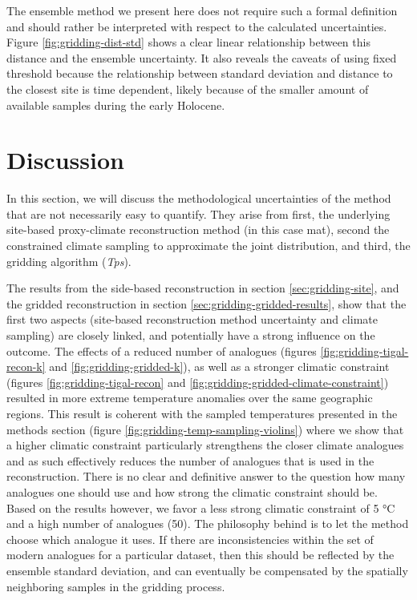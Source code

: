 \documentclass[
11pt, %
english, %
singlespacing, %
headsepline, %
]{MastersDoctoralThesis} %
\begin{document}
\begin{NoHyper}
\begin{refsection}
The ensemble method we present here does not require such a formal definition and should rather be interpreted with respect to the calculated uncertainties. Figure \ref{fig:gridding-dist-std} shows a clear linear relationship between this distance and the ensemble uncertainty. It also reveals the caveats of using fixed threshold because the relationship between standard deviation and distance to the closest site is time dependent, likely because of the smaller amount of available samples during the early Holocene.

\section{Discussion}  \label{sec:gridding-discussion}
In this section, we will discuss the methodological uncertainties of the method that are not necessarily easy to quantify. They arise from first, the underlying site-based proxy-climate reconstruction method (in this case \gls{mat}), second the constrained climate sampling to approximate the joint distribution, and third, the gridding algorithm (\textit{Tps}).

The results from the side-based reconstruction in section \ref{sec:gridding-site}, and the gridded reconstruction in section \ref{sec:gridding-gridded-results}, show that the first two aspects (site-based reconstruction method uncertainty and climate sampling) are closely linked, and potentially have a strong influence on the outcome. The effects of a reduced number of analogues (figures \ref{fig:gridding-tigal-recon-k} and \ref{fig:gridding-gridded-k}), as well as a stronger climatic constraint (figures \ref{fig:gridding-tigal-recon} and \ref{fig:gridding-gridded-climate-constraint}) resulted in more extreme temperature anomalies over the same geographic regions. This result is coherent with the sampled temperatures presented in the methods section (figure \ref{fig:gridding-temp-sampling-violins}) where we show that a higher climatic constraint particularly strengthens the closer climate analogues and as such effectively reduces the number of  analogues that is used in the reconstruction. There is no clear and definitive answer to the question how many analogues one should use and how strong the climatic constraint should be. Based on the results however, we favor a less strong climatic constraint of 5 °C and a high number of analogues (50). The philosophy behind is to let the method choose which analogue it uses. If there are inconsistencies within the set of modern analogues for a particular dataset, then this should be reflected by the ensemble standard deviation, and can eventually be compensated by the spatially neighboring samples in the gridding process.


\end{refsection}
\end{NoHyper}
\end{document}
